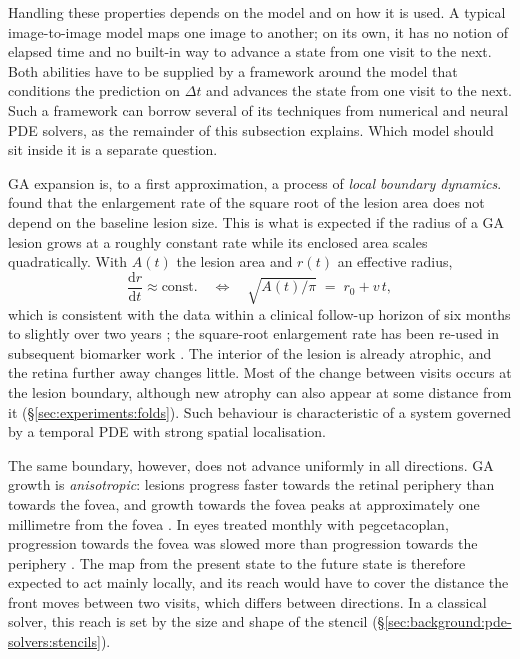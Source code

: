 Handling these properties depends on the model and on how it is used. A typical image-to-image model maps one image
to another; on its own, it has no notion of elapsed time and no built-in way
to advance a state from one visit to the next. Both abilities have to be
supplied by a framework around the model that conditions the prediction
on $\Delta t$ and advances the state from one visit to the next. Such a framework
can borrow several of its techniques from numerical and neural PDE
solvers, as the remainder of this subsection explains. Which model should
sit inside it is a separate question.


GA expansion is, to a first approximation, a process of \emph{local boundary
dynamics}. \citet{Yehoshua2011} found that the enlargement rate of the square
root of the lesion area does not depend on the baseline lesion size. This is
what is expected if the radius of a GA lesion grows at a roughly constant
rate while its enclosed area scales quadratically. With $A(t)$ the lesion
area and $r(t)$ an effective radius,
\begin{equation}
  \frac{\mathrm{d}r}{\mathrm{d}t} \approx \mathrm{const.}
  \quad\Longleftrightarrow\quad
  \sqrt{A(t)/\pi} \;=\; r_0 + v\, t,
  \label{eq:intro:boundary-growth}
\end{equation}
which is consistent with the data within a clinical follow-up horizon of six
months to slightly over two years \citep{Yehoshua2011}; the square-root
enlargement rate has been re-used in subsequent biomarker work
\citep{Chu2022}. The interior of the lesion is already atrophic, and the
retina further away changes little. Most of the change between visits
occurs at the lesion boundary, although new atrophy can also appear at
some distance from it (\S\ref{sec:experiments:folds}). Such behaviour is characteristic of
a system governed by a temporal PDE with strong spatial localisation.


The same boundary, however, does not advance uniformly in all directions.
GA growth is \emph{anisotropic}: lesions progress faster towards the retinal
periphery than towards the fovea, and growth towards the fovea peaks at
approximately one millimetre from the fovea \citep{Singh2025}. In eyes
treated monthly with pegcetacoplan, progression towards the fovea was
slowed more than progression towards the periphery \citep{Singh2025}. The
map from the present state to the future state is therefore expected to
act mainly locally, and its reach would have to cover the distance the
front moves between two visits, which differs between directions. In a
classical solver, this reach is set by the size and shape of the
stencil (\S\ref{sec:background:pde-solvers:stencils}).


